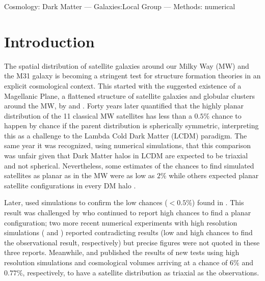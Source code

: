 \documentclass[a4paper,fleqn,usenatbib]{mnras}
\begin{document}
\begin{keywords}Cosmology: Dark Matter --- Galaxies:Local Group ---
  Methods: numerical  
\end{keywords}

\section{Introduction}

The spatial distribution of satellite galaxies around our Milky Way
(MW) and the M31 galaxy is becoming a stringent test for structure
formation theories in an explicit cosmological context. 
This started with the suggested existence of a Magellanic Plane, a flattened
structure of satellite galaxies and globular clusters around the MW,
by \cite{1976RGOB..182..241K} and \cite{1976MNRAS.174..695L}.  
Forty years later \cite{2005A&A...431..517K} quantified that the
highly planar distribution of the 11 classical MW satellites has less
than a $0.5\%$ chance to happen by chance if the
parent distribution is spherically symmetric, interpreting this as a
challenge to the Lambda Cold Dark Matter (LCDM) paradigm.
The same year it was recognized, using numerical simulations, that
this comparison was unfair given that Dark Matter halos in LCDM
are expected to be triaxial and not spherical.
Nevertheless, some estimates of the chances to find simulated satellites as
planar as in the MW 
were as low as $2\%$ \citep{2005ApJ...629..219Z,2005A&A...437..383K} while others expected
planar satellite configurations in every DM halo
\citep{2005MNRAS.363..146L}.

Later, \cite{2007MNRAS.374.1125M} used simulations to confirm the low
chances ($<0.5\%$) found in \cite{2005A&A...431..517K}.
This result was challenged by \cite{2009MNRAS.399..550L} who continued
to report high chances to find a planar configuration;
two more recent numerical experiments with high resolution simulations
(\cite{2013MNRAS.429..725S} and \cite{2016MNRAS.457.1931S}) reported
contradicting results (low and high chances to find the observational
result, respectively) but precise figures were not quoted in these three reports. 
Meanwhile, \cite{2013MNRAS.429.1502W} and \cite{2014ApJ...789L..24P} published
the results of new tests using high resolution simulations and cosmological
volumes arriving at a chance of $6\%$ and $0.77\%$, respectively, to
have a satellite distribution as triaxial as the observations. 
\end{document}
